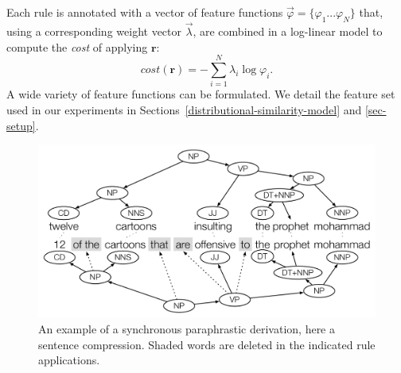 \documentclass[11pt]{article}
\begin{document}
Each rule is annotated with a vector of feature functions
$\vec{\varphi} = \{\varphi_1 ... \varphi_N \}$ that, using a
corresponding weight vector $\vec{\lambda}$, are combined in a
log-linear model to compute the \emph{cost} of applying $\mathbf{r}$:
\begin{equation}
  \mathit{cost}(\mathbf{r}) = -\sum_{i=1}^N \lambda_i \log \varphi_i .
\end{equation}
A wide variety of feature functions can be formulated. We detail the
feature set used in our experiments in Sections~\ref{distributional-similarity-model} and \ref{sec-setup}.

\begin{figure}[!t]
\begin{center}
\includegraphics[width=0.99\linewidth]{figures/example_compression.pdf}
\end{center}
\caption{An example of a synchronous paraphrastic derivation, here a
  sentence compression. Shaded words are deleted in the indicated rule
  applications.}
\label{fig-example-compression}
\end{figure}
\end{document}
